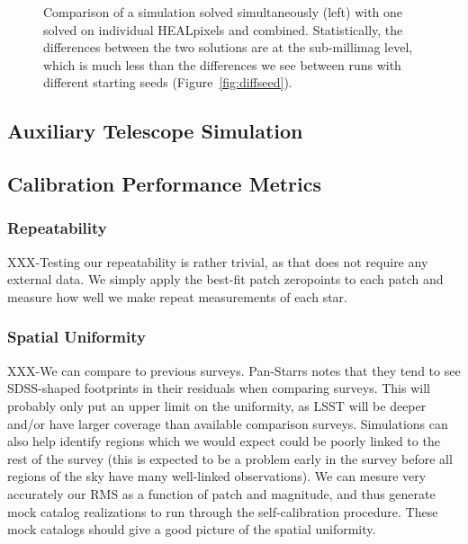 \documentclass[12pt,preprint]{aastex}
\begin{document}
\begin{figure}
\caption{Comparison of a simulation solved simultaneously (left) with one solved on individual HEALpixels and combined.  Statistically, the differences between the two solutions are at the sub-millimag level, which is much less than the differences we see between runs with different starting seeds (Figure~\ref{fig:diffseed}). \label{fig:hpvglobal}}
\end{figure}



\subsection{Auxiliary Telescope Simulation}

\subsection{Calibration Performance Metrics}

\subsubsection{Repeatability}

XXX-Testing our repeatability is rather trivial, as that does not require
any external data.  We simply apply the best-fit patch zeropoints to
each patch and measure how well we make repeat measurements of each
star.

\subsubsection{Spatial Uniformity}

XXX-We can compare to previous surveys.  Pan-Starrs notes that they
tend to see SDSS-shaped footprints in their residuals when comparing
surveys.  This will probably only put an upper limit on the
uniformity, as LSST will be deeper and/or have larger coverage than
available comparison surveys.  Simulations can also help identify
regions which we would expect could be poorly linked to the rest of
the survey (this is expected to be a problem early in the survey
before all regions of the sky have many well-linked observations).  We
can mesure very accurately our RMS as a function of patch and
magnitude, and thus generate mock catalog realizations to run through
the self-calibration procedure.  These mock catalogs should give a
good picture of the spatial uniformity.
\end{document}
